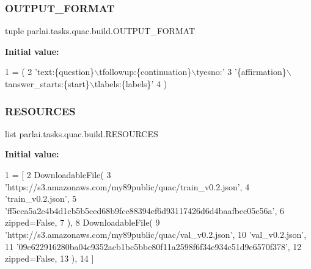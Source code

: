 \subsubsection{\texorpdfstring{O\+U\+T\+P\+U\+T\+\_\+\+F\+O\+R\+M\+AT}{OUTPUT\_FORMAT}}
{\footnotesize\ttfamily tuple parlai.\+tasks.\+quac.\+build.\+O\+U\+T\+P\+U\+T\+\_\+\+F\+O\+R\+M\+AT}

{\bfseries Initial value\+:}
\begin{DoxyCode}
1 =  (
2     \textcolor{stringliteral}{'text:\{question\}\(\backslash\)tfollowup:\{continuation\}\(\backslash\)tyesno:'}
3     \textcolor{stringliteral}{'\{affirmation\}\(\backslash\)tanswer\_starts:\{start\}\(\backslash\)tlabels:\{labels\}'}
4 )
\end{DoxyCode}
\mbox{\label{namespaceparlai_1_1tasks_1_1quac_1_1build_abf5a1571ea64d0a10f2e2657893802da}} 
\subsubsection{\texorpdfstring{R\+E\+S\+O\+U\+R\+C\+ES}{RESOURCES}}
{\footnotesize\ttfamily list parlai.\+tasks.\+quac.\+build.\+R\+E\+S\+O\+U\+R\+C\+ES}

{\bfseries Initial value\+:}
\begin{DoxyCode}
1 =  [
2     DownloadableFile(
3         \textcolor{stringliteral}{'https://s3.amazonaws.com/my89public/quac/train\_v0.2.json'},
4         \textcolor{stringliteral}{'train\_v0.2.json'},
5         \textcolor{stringliteral}{'ff5cca5a2e4b4d1cb5b5ced68b9fce88394ef6d93117426d6d4baafbcc05c56a'},
6         zipped=\textcolor{keyword}{False},
7     ),
8     DownloadableFile(
9         \textcolor{stringliteral}{'https://s3.amazonaws.com/my89public/quac/val\_v0.2.json'},
10         \textcolor{stringliteral}{'val\_v0.2.json'},
11         \textcolor{stringliteral}{'09e622916280ba04c9352acb1bc5bbe80f11a2598f6f34e934c51d9e6570f378'},
12         zipped=\textcolor{keyword}{False},
13     ),
14 ]
\end{DoxyCode}
\mbox{\label{namespaceparlai_1_1tasks_1_1quac_1_1build_a5f8e1b371211c16c440b76b8ae3f3af6}} 
